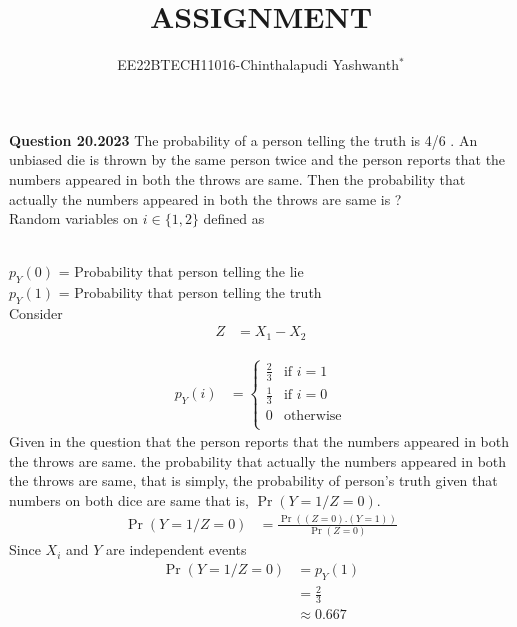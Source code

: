 \documentclass[journal,12pt,twocolumn]{IEEEtran}
\theoremstyle{remark}
\begin{document}

\vspace{3cm}

\title{ASSIGNMENT}
\author{EE22BTECH11016-Chinthalapudi Yashwanth$^{*}$%
}
\maketitle
\newpage
\bigskip
\renewcommand{\thefigure}{\theenumi}
\renewcommand{\thetable}{\theenumi}

\textbf{Question 20.2023}
The probability of a person telling the truth is 4/6 . An unbiased die is thrown by
the same person twice and the person reports that the numbers appeared in both
the throws are same. Then the probability that actually the numbers appeared in
both the throws are same is ?\\
\solution
Random variables on $i \in \{1,2\} $ defined as
\begin{table}[!ht]
	
\end{table}\\
$p_Y(0)$ = Probability that person telling the lie\\
$p_Y(1)$ = Probability that person telling the truth\\
Consider
\begin{align}
Z&=X_1-X_2
\end{align}
\begin{table}[!ht]
	
\end{table}
\begin{align}
p_Y(i) &= \begin{cases}
	    \frac{2}{3} & \text{if } i = 1\\
	    \frac{1}{3} & \text{if } i = 0\\
	    0 & \text{otherwise}\\
          \end{cases}
\end{align}
Given in the question that the person reports that the numbers appeared in both
the throws are same. the probability that actually the numbers appeared in
both the throws are same, that is simply, the probability of person's truth given that numbers on both dice are same that is, $\Pr(Y=1 / Z=0)$.
\begin{align} 
\Pr(Y=1 / Z=0) &= \frac{\Pr((Z=0) . (Y=1))}{\Pr(Z=0)}
\end{align}
Since $X_i$ and $Y$ are independent events
\begin{align}
\Pr(Y=1 / Z=0) &= p_Y(1)\\
&= \frac{2}{3}\\
&\approx 0.667
\end{align}
\end{document}
